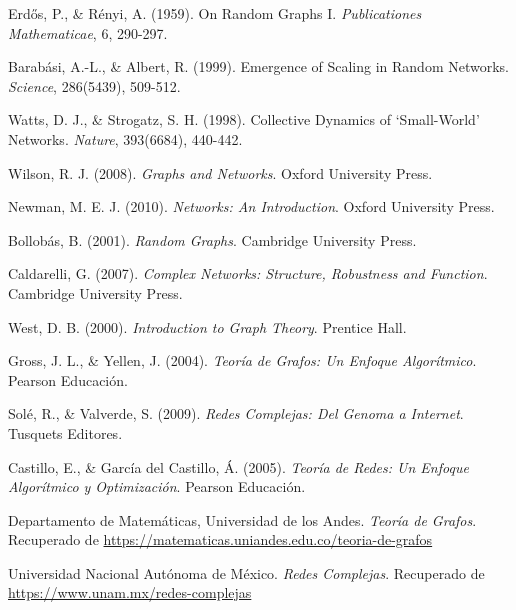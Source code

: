 \documentclass[12pt]{book}
\begin{document}
\begin{thebibliography}{9}
    
Erdős, P., \& Rényi, A. (1959). On Random Graphs I. \textit{Publicationes Mathematicae}, 6, 290-297.

Barabási, A.-L., \& Albert, R. (1999). Emergence of Scaling in Random Networks. \textit{Science}, 286(5439), 509-512.

Watts, D. J., \& Strogatz, S. H. (1998). Collective Dynamics of ‘Small-World’ Networks. \textit{Nature}, 393(6684), 440-442.

    Wilson, R. J. (2008). \textit{Graphs and Networks}. Oxford University Press.
    
    Newman, M. E. J. (2010). \textit{Networks: An Introduction}. Oxford University Press.
    
    Bollobás, B. (2001). \textit{Random Graphs}. Cambridge University Press.
    
    Caldarelli, G. (2007). \textit{Complex Networks: Structure, Robustness and Function}. Cambridge University Press.
    
    West, D. B. (2000). \textit{Introduction to Graph Theory}. Prentice Hall.

Gross, J. L., \& Yellen, J. (2004). \textit{Teoría de Grafos: Un Enfoque Algorítmico}. Pearson Educación.

Solé, R., \& Valverde, S. (2009). \textit{Redes Complejas: Del Genoma a Internet}. Tusquets Editores.

Castillo, E., \& García del Castillo, Á. (2005). \textit{Teoría de Redes: Un Enfoque Algorítmico y Optimización}. Pearson Educación.

Departamento de Matemáticas, Universidad de los Andes. \textit{Teoría de Grafos}. Recuperado de \url{https://matematicas.uniandes.edu.co/teoria-de-grafos}

Universidad Nacional Autónoma de México. \textit{Redes Complejas}. Recuperado de \url{https://www.unam.mx/redes-complejas}

    
    \end{thebibliography}
\end{document}
